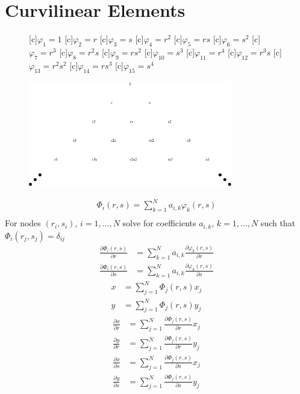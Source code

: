 \documentclass[11pt]{article}
\begin{document}
\section{Curvilinear Elements}
\begin{figure}
[c]{$\varphi_1 = 1$}
[c]{$\varphi_2 = r$}
[c]{$\varphi_3 = s$}
[c]{$\varphi_4 = r^2$}
[c]{$\varphi_5 = rs$}
[c]{$\varphi_6 = s^2$}
[c]{$\varphi_7 = r^3$}
[c]{$\varphi_8 = r^2s$}
[c]{$\varphi_9 = rs^2$}
[c]{$\varphi_{10} = s^3$}
[c]{$\varphi_{11} = r^4$}
[c]{$\varphi_{12} = r^3s$}
[c]{$\varphi_{13} = r^2s^2$}
[c]{$\varphi_{14} = rs^3$}
[c]{$\varphi_{15} = s^4$}
\centerline{\includegraphics[width=3.5in]{./pascal.eps}}
\end{figure}
\begin{align}
\Phi_i(r,s) = \displaystyle\sum_{k=1}^N a_{i,k} \varphi_k(r,s) \\
\end{align}
For nodes $(r_i,s_i)$, $i = 1,\ldots,N$ solve for coefficients $a_{i,k}$, $k = 1,\ldots,N$ such that $\Phi_i(r_j,s_j) = \delta_{ij}$
\begin{align}
\frac{\partial \Phi_i(r,s)}{\partial r} &= \displaystyle\sum_{k=1}^N a_{i,k} \frac{\partial \varphi_k(r,s)}{\partial r} \\
\frac{\partial \Phi_i(r,s)}{\partial s} &= \displaystyle\sum_{k=1}^N a_{i,k} \frac{\partial \varphi_k(r,s)}{\partial s}
\end{align}
\begin{align}
x &= \displaystyle\sum_{j = 1}^N \Phi_j(r,s)x_j \\
y &= \displaystyle\sum_{j = 1}^N \Phi_j(r,s)y_j
\end{align}
\begin{align}
\frac{\partial x}{\partial r} &= \displaystyle\sum_{j = 1}^N \frac{\partial \Phi_j(r,s)}{\partial r}x_j \\
\frac{\partial y}{\partial r} &= \displaystyle\sum_{j = 1}^N \frac{\partial \Phi_j(r,s)}{\partial r}y_j \\
\frac{\partial x}{\partial s} &= \displaystyle\sum_{j = 1}^N \frac{\partial \Phi_j(r,s)}{\partial s}x_j \\
\frac{\partial y}{\partial s} &= \displaystyle\sum_{j = 1}^N \frac{\partial \Phi_j(r,s)}{\partial s}y_j
\end{align}
\end{document}
